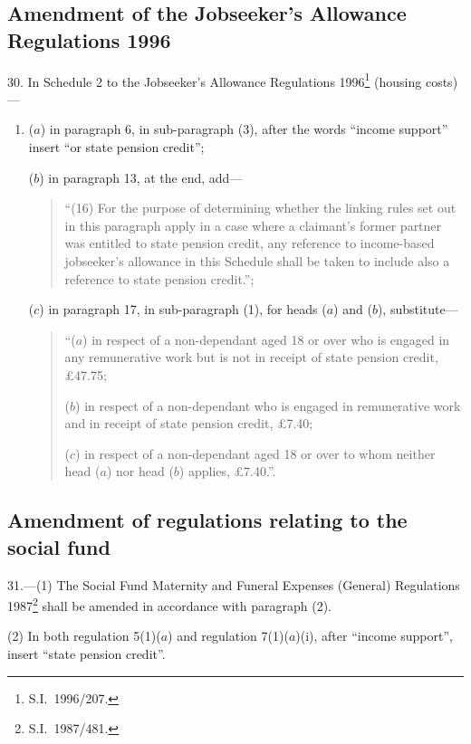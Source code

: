 \documentclass[12pt,a4paper]{article}
\begin{document}
\subsection[30. Amendment of the Jobseeker’s Allowance Regulations 1996]{Amendment of the Jobseeker’s Allowance Regulations 1996}

30.  In Schedule 2 to the Jobseeker’s Allowance Regulations 1996\footnote{S.I.\ 1996/207.} (housing costs)—
\begin{enumerate}\item[]
($a$) in paragraph 6, in sub-paragraph (3), after the words “income support” insert “or state pension credit”;

($b$) in paragraph 13, at the end, add—
\begin{quotation}
“(16) For the purpose of determining whether the linking rules set out in this paragraph apply in a case where a claimant’s former partner was entitled to state pension credit, any reference to income-based jobseeker’s allowance in this Schedule shall be taken to include also a reference to state pension credit.”;
\end{quotation}

($c$) in paragraph 17, in sub-paragraph (1), for heads ($a$)  and ($b$), substitute—
\begin{quotation}
“($a$) in respect of a non-dependant aged 18 or over who is engaged in any remunerative work but is not in receipt of state pension credit, £47$.$75;

($b$) in respect of a non-dependant who is engaged in remunerative work and in receipt of state pension credit, £7$.$40;

($c$) in respect of a non-dependant aged 18 or over to whom neither head ($a$)  nor head ($b$)  applies, £7$.$40.”.
\end{quotation}
\end{enumerate}

\subsection[31. Amendment of regulations relating to the social fund]{Amendment of regulations relating to the social fund}

31.---(1)  The Social Fund Maternity and Funeral Expenses (General) Regulations 1987\footnote{S.I.\ 1987/481.} shall be amended in accordance with paragraph (2).

(2) In both regulation 5(1)($a$)  and regulation 7(1)($a$)(i), after “income support”, insert “state pension credit”.
\end{document}

